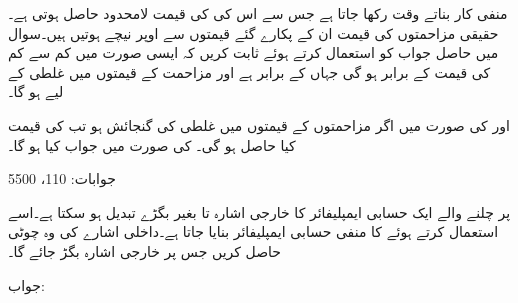 منفی کار بناتے وقت  رکھا جاتا ہے جس سے  اس کی  کی قیمت لامحدود حاصل ہوتی ہے۔حقیقی مزاحمتوں کی قیمت ان کے پکارے گئے قیمتوں سے اوپر نیچے ہوتیں ہیں۔سوال  میں حاصل جواب کو استعمال کرتے ہوئے ثابت کریں کہ ایسی صورت میں  کم سے کم   کی قیمت  کے برابر ہو گی جہاں  کے برابر ہے اور مزاحمت کے قیمتوں میں  غلطی کے لیے  ہو گا۔

 اور  کی صورت میں اگر مزاحمتوں کے قیمتوں میں   غلطی کی گنجائش ہو تب   کی قیمت کیا حاصل ہو گی۔ کی صورت میں جواب کیا ہو گا۔ 

جوابات: 110،  5500

 پر چلنے والے ایک حسابی ایمپلیفائر کا خارجی اشارہ  تا   بغیر بگڑے تبدیل ہو سکتا ہے۔اسے استعمال کرتے ہوئے  کا منفی حسابی ایمپلیفائر بنایا جاتا ہے۔داخلی اشارے کی وہ چوٹی  حاصل کریں جس پر خارجی اشارہ بگڑ جائے گا۔

جواب: 

